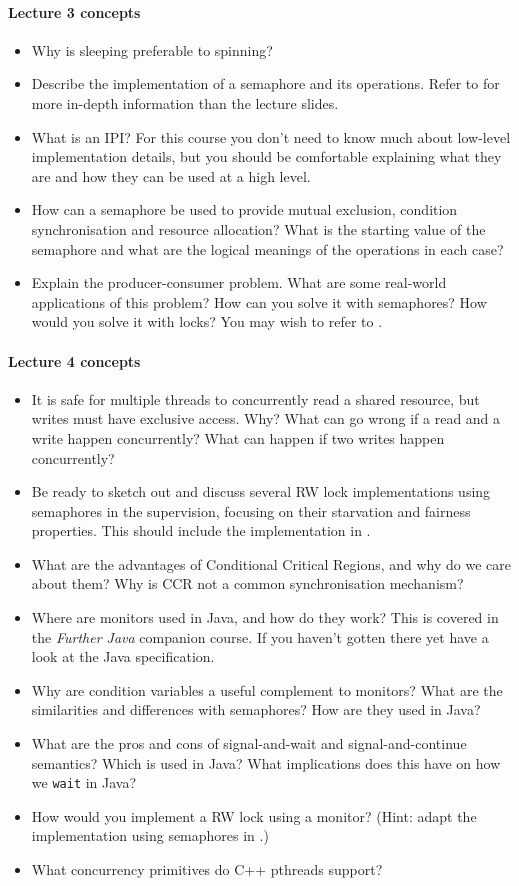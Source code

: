 \documentclass[12pt,a4paper,oneside,openright]{report}
\newcommand{\question}[2]{\paragraph{#1} #2}
\begin{document}
\question{Lecture 3 concepts}{
  \begin{itemize}
  \item Why is sleeping preferable to spinning?
  \item Describe the implementation of a semaphore and its
    operations. Refer to
    \cite[Chapters~10.4--10.6]{bacon2003operating} for more in-depth
    information than the lecture slides.
  \item What is an IPI? For this course you don't need to know much
    about low-level implementation details, but you should be
    comfortable explaining what they are and how they can be used at a
    high level.
  \item How can a semaphore be used to provide mutual exclusion,
    condition synchronisation and resource allocation? What is the
    starting value of the semaphore and what are the logical meanings
    of the operations in each case?
  \item Explain the producer-consumer problem. What are some
    real-world applications of this problem? How can you solve it with
    semaphores? How would you solve it with locks? You may wish to
    refer to \cite[Chapter~11.3]{bacon2003operating}.
  \end{itemize}
}

\question{Lecture 4 concepts}{
  \begin{itemize}
  \item It is safe for multiple threads to concurrently read a shared
    resource, but writes must have exclusive access. Why?  What can go
    wrong if a read and a write happen concurrently?  What can happen
    if two writes happen concurrently?
  \item Be ready to sketch out and discuss several RW lock
    implementations using semaphores in the supervision, focusing on
    their starvation and fairness properties. This should include the
    implementation in \cite[Chapter~11.5]{bacon2003operating}.
  \item What are the advantages of Conditional Critical Regions, and
    why do we care about them? Why is CCR not a common synchronisation
    mechanism?
  \item Where are monitors used in Java, and how do they work? This is
    covered in the \emph{Further Java} companion course. If you
    haven't gotten there yet have a look at the Java specification.
  \item Why are condition variables a useful complement to monitors?
    What are the similarities and differences with semaphores? How are
    they used in Java?
  \item What are the pros and cons of signal-and-wait and
    signal-and-continue semantics? Which is used in Java? What
    implications does this have on how we \texttt{wait} in Java?
  \item How would you implement a RW lock using a monitor? (Hint:
    adapt the implementation using semaphores in
    \cite[Chapter~11.5]{bacon2003operating}.)
  \item What concurrency primitives do C++ pthreads support?
  \end{itemize}
}
\end{document}
